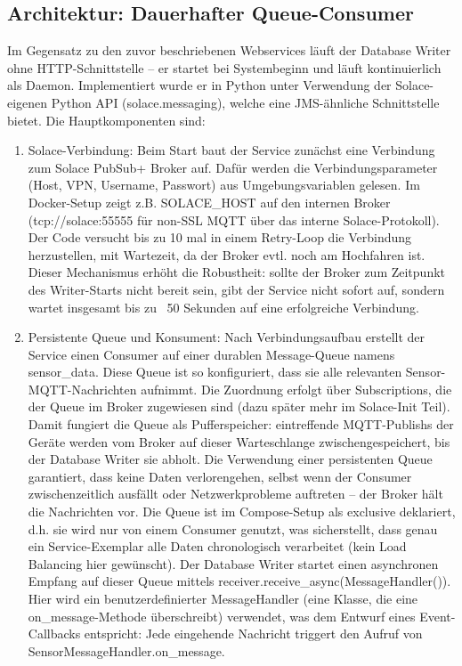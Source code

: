 \subsection{Architektur: Dauerhafter Queue-Consumer}
Im Gegensatz zu den zuvor beschriebenen Webservices läuft der Database Writer ohne HTTP-Schnittstelle – er startet bei Systembeginn und läuft kontinuierlich als Daemon. Implementiert wurde er in Python unter Verwendung der Solace-eigenen Python API (solace.messaging), welche eine JMS-ähnliche Schnittstelle bietet. Die Hauptkomponenten sind:
\begin{enumerate}
    \item Solace-Verbindung: Beim Start baut der Service zunächst eine Verbindung zum Solace PubSub+ Broker auf. Dafür werden die Verbindungsparameter (Host, VPN, Username, Passwort) aus Umgebungsvariablen gelesen. Im Docker-Setup zeigt z.B. SOLACE\_HOST auf den internen Broker (tcp://solace:55555 für non-SSL MQTT über das interne Solace-Protokoll). Der Code versucht bis zu 10 mal in einem Retry-Loop die Verbindung herzustellen, mit Wartezeit, da der Broker evtl. noch am Hochfahren ist. Dieser Mechanismus erhöht die Robustheit: sollte der Broker zum Zeitpunkt des Writer-Starts nicht bereit sein, gibt der Service nicht sofort auf, sondern wartet insgesamt bis zu ~50 Sekunden auf eine erfolgreiche Verbindung.
    \item Persistente Queue und Konsument: Nach Verbindungsaufbau erstellt der Service einen Consumer auf einer durablen Message-Queue namens sensor\_data. Diese Queue ist so konfiguriert, dass sie alle relevanten Sensor-MQTT-Nachrichten aufnimmt. Die Zuordnung erfolgt über Subscriptions, die der Queue im Broker zugewiesen sind (dazu später mehr im Solace-Init Teil). Damit fungiert die Queue als Pufferspeicher: eintreffende MQTT-Publishs der Geräte werden vom Broker auf dieser Warteschlange zwischengespeichert, bis der Database Writer sie abholt. Die Verwendung einer persistenten Queue garantiert, dass keine Daten verlorengehen, selbst wenn der Consumer zwischenzeitlich ausfällt oder Netzwerkprobleme auftreten – der Broker hält die Nachrichten vor. Die Queue ist im Compose-Setup als exclusive deklariert, d.h. sie wird nur von einem Consumer genutzt, was sicherstellt, dass genau ein Service-Exemplar alle Daten chronologisch verarbeitet (kein Load Balancing hier gewünscht). Der Database Writer startet einen asynchronen Empfang auf dieser Queue mittels receiver.receive\_async(MessageHandler()). Hier wird ein benutzerdefinierter MessageHandler (eine Klasse, die eine on\_message-Methode überschreibt) verwendet, was dem Entwurf eines Event-Callbacks entspricht: Jede eingehende Nachricht triggert den Aufruf von SensorMessageHandler.on\_message.

\end{enumerate}
